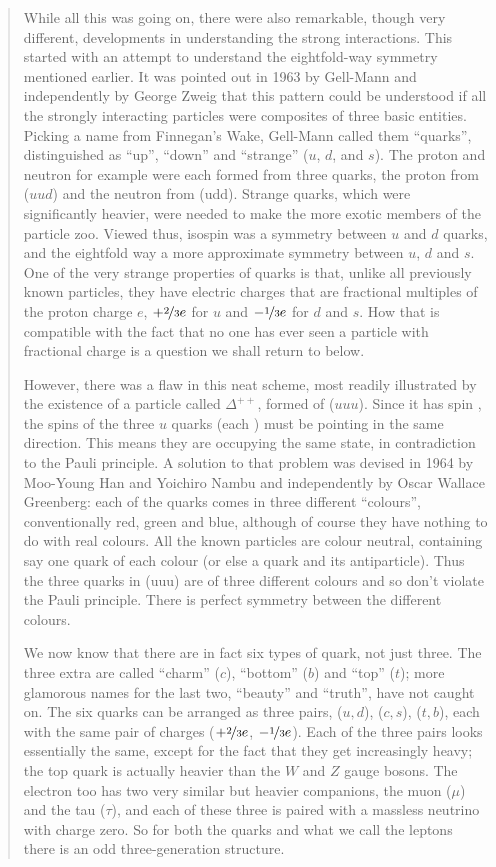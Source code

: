 \begin{quote}
While all this was going on, there were also remarkable, though very different, developments in understanding the strong interactions. This started with an attempt to understand the eightfold-way symmetry mentioned earlier. It was pointed out in 1963 by Gell-Mann and independently by George Zweig that this pattern could be understood if all the strongly interacting particles were composites of three basic entities. Picking a name from Finnegan’s Wake, Gell-Mann called them “quarks”, distinguished as “up”, “down” and “strange” ($u$, $d$, and $s$). The proton and neutron for example were each formed from three quarks, the proton from ($uud$) and the neutron from (udd). Strange quarks, which were significantly heavier, were needed to make the more exotic members of the particle zoo. Viewed thus, isospin was a symmetry between $u$ and $d$ quarks, and the eightfold way a more approximate symmetry between $u$, $d$ and $s$. One of the very strange properties of quarks is that, unlike all previously known particles, they have electric charges that are fractional multiples of the proton charge $e$, $+ \nicefrac{2}{3} e$ for $u$ and $-\nicefrac{1}{3} e$ for $d$ and $s$. How that is compatible with the fact that no one has ever seen a particle with fractional charge is a question we shall return to below.

However, there was a flaw in this neat scheme, most readily illustrated by the existence of a particle called $\Delta^{++}$, formed of ($uuu$). Since it has spin  , the spins of the three $u$ quarks (each ) must be pointing in the same direction. This means they are occupying the same state, in contradiction to the Pauli principle. A solution to that problem was devised in 1964 by Moo-Young Han and Yoichiro Nambu and independently by Oscar Wallace Greenberg: each of the quarks comes in three different “colours”, conventionally red, green and blue, although of course they have nothing to do with real colours. All the known particles are colour neutral, containing say one quark of each colour (or else a quark and its antiparticle). Thus the three quarks in (uuu) are of three different colours and so don’t violate the Pauli principle. There is perfect symmetry between the different colours.

We now know that there are in fact six types of quark, not just three. The three extra are called “charm” ($c$), “bottom” ($b$) and “top” ($t$); more glamorous names for the last two, “beauty” and “truth”, have not caught on. The six quarks can be arranged as three pairs, ($u,d$), ($c,s$), ($t,b$), each with the same pair of charges ($+ \nicefrac{2}{3} e$, $- \nicefrac{1}{3} e$). Each of the three pairs looks essentially the same, except for the fact that they get increasingly heavy; the top quark is actually heavier than the $W$ and $Z$ gauge bosons. The electron too has two very similar but heavier companions, the muon ($\mu$) and the tau ($\tau$), and each of these three is paired with a massless neutrino with charge zero. So for both the quarks and what we call the leptons there is an odd three-generation structure.


\end{quote}
